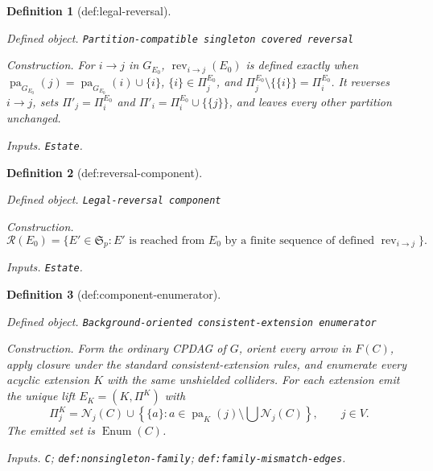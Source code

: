 \documentclass{article}
\newtheorem{definition}{Definition}
\begin{document}
\begin{definition}[def:legal-reversal]\label{def:legal-reversal}
\par\smallskip\noindent\emph{Defined object.} \texttt{Partition-\allowbreak{}compatible singleton covered reversal}
\par\smallskip\noindent\emph{Construction.} For \(i\to j\) in \(G_{E_0}\), \(\operatorname{rev}_{i\to j}(E_0)\) is defined exactly when \(\operatorname{pa}_{G_{E_0}}(j)=\operatorname{pa}_{G_{E_0}}(i)\cup\{i\}\), \(\{i\}\in\Pi^{E_0}_j\), and \(\Pi^{E_0}_j\setminus\{\{i\}\}=\Pi^{E_0}_i\). It reverses \(i\to j\), sets \(\Pi'_j=\Pi^{E_0}_i\) and \(\Pi'_i=\Pi^{E_0}_i\cup\{\{j\}\}\), and leaves every other partition unchanged.
\par\smallskip\noindent\emph{Inputs.} \texttt{Estate}.
\end{definition}

\begin{definition}[def:reversal-component]\label{def:reversal-component}
\par\smallskip\noindent\emph{Defined object.} \texttt{Legal-\allowbreak{}reversal component}
\par\smallskip\noindent\emph{Construction.} \[\mathcal R(E_0)=\{E'\in\mathfrak S_p:E'\text{ is reached from }E_0\text{ by a finite sequence of defined }\operatorname{rev}_{i\to j}\}.\]
\par\smallskip\noindent\emph{Inputs.} \texttt{Estate}.
\end{definition}

\begin{definition}[def:component-enumerator]\label{def:component-enumerator}
\par\smallskip\noindent\emph{Defined object.} \texttt{Background-\allowbreak{}oriented consistent-\allowbreak{}extension enumerator}
\par\smallskip\noindent\emph{Construction.} Form the ordinary CPDAG of \(G\), orient every arrow in \(F(C)\), apply closure under the standard consistent-extension rules, and enumerate every acyclic extension \(K\) with the same unshielded colliders. For each extension emit the unique lift \(E_K=(K,\Pi^K)\) with \[\Pi^K_j=\mathcal N_j(C)\cup\left\{\{a\}:a\in\operatorname{pa}_K(j)\setminus\bigcup\mathcal N_j(C)\right\},\qquad j\in V.\] The emitted set is \(\operatorname{Enum}(C)\).
\par\smallskip\noindent\emph{Inputs.} \texttt{C}; \texttt{def:\allowbreak{}nonsingleton-\allowbreak{}family}; \texttt{def:\allowbreak{}family-\allowbreak{}mismatch-\allowbreak{}edges}.
\end{definition}
\end{document}
